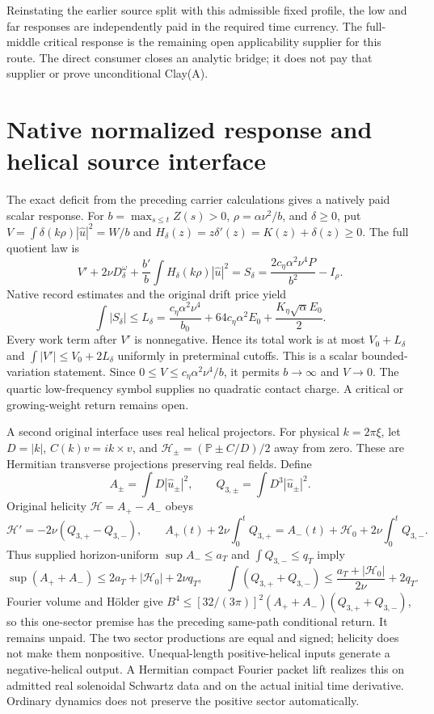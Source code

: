 \documentclass[11pt]{article}
\begin{document}
Reinstating the earlier source split with this admissible fixed profile,
the low and far responses are independently paid in the required time
currency. The full-middle critical response is the remaining open
applicability supplier for this route. The direct consumer closes an
analytic bridge; it does not pay that supplier or prove unconditional
Clay(A).


\section{Native normalized response and helical source interface}

The exact deficit from the preceding carrier calculations gives a
natively paid scalar response. For $b=\max_{s\le t}Z(s)>0$,
$\rho=\alpha\nu^2/b$, and $\delta\ge0$, put
$V=\int\delta(k\rho)|\widehat u|^2=W/b$ and
$H_\delta(z)=z\delta'(z)=K(z)+\delta(z)\ge0$. The full quotient law is
\[
 V'+2\nu D_\delta^\omega+
 \frac{b'}b\int H_\delta(k\rho)|\widehat u|^2
 =S_\delta=\frac{2c_\eta\alpha^2\nu^4P}{b^2}-I_\rho.
\]
Native record estimates and the original drift price yield
\[
 \int|S_\delta|\le L_\delta
 =\frac{c_\eta\alpha^2\nu^4}{b_0}
 +64c_\eta\alpha^2E_0+\frac{K_\eta\sqrt\alpha E_0}{2}.
\]
Every work term after $V'$ is nonnegative. Hence its total work is at
most $V_0+L_\delta$ and $\int|V'|\le V_0+2L_\delta$ uniformly in
preterminal cutoffs. This is a scalar bounded-variation statement.
Since $0\le V\le c_\eta\alpha^2\nu^4/b$, it permits $b\to\infty$
and $V\to0$. The quartic low-frequency symbol supplies no quadratic
contact charge. A critical or growing-weight return remains open.

A second original interface uses real helical projectors. For physical
$k=2\pi\xi$, let $D=|k|$, $C(k)v=ik\times v$, and
$\mathcal H_\pm=(\mathbb P\pm C/D)/2$ away from zero. These are
Hermitian transverse projections preserving real fields. Define
\[
 A_\pm=\int D|\widehat u_\pm|^2,\qquad
 Q_{3,\pm}=\int D^3|\widehat u_\pm|^2.
\]
Original helicity $\mathcal H=A_+-A_-$ obeys
\[
 \mathcal H'=-2\nu(Q_{3,+}-Q_{3,-}),\qquad
 A_+(t)+2\nu\int_0^tQ_{3,+}
 =A_-(t)+\mathcal H_0+2\nu\int_0^tQ_{3,-}.
\]
Thus supplied horizon-uniform $\sup A_-\le a_T$ and
$\int Q_{3,-}\le q_T$ imply
\[
 \sup(A_++A_-)\le2a_T+|\mathcal H_0|+2\nu q_T,
 \qquad \int(Q_{3,+}+Q_{3,-})
 \le\frac{a_T+|\mathcal H_0|}{2\nu}+2q_T.
\]
Fourier volume and H\"older give
$B^4\le [32/(3\pi)]^2(A_++A_-)(Q_{3,+}+Q_{3,-})$,
so this one-sector premise has the preceding same-path conditional return.
It remains unpaid. The two sector productions are equal and signed;
helicity does not make them nonpositive. Unequal-length positive-helical
inputs generate a negative-helical output. A Hermitian compact Fourier
packet lift realizes this on admitted real solenoidal Schwartz data and
on the actual initial time derivative. Ordinary dynamics does not preserve
the positive sector automatically.
\end{document}
